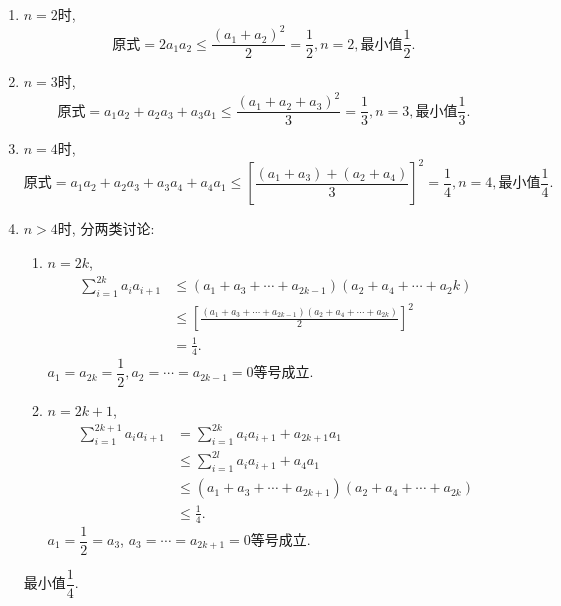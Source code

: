 \documentclass[8pt]{article}
\begin{document}
\begin{enumerate}
			\begin{enumerate}[label=$\arabic*^{\circ}$]
				\item $n=2$时, $$\text{原式}=2a_1 a_2 \leq \frac{(a_1 + a_2)^2}{2}=\frac{1}{2}, n=2, \text{最小值}\frac{1}{2}.$$
				\item $n=3$时, $$\text{原式}=a_1 a_2 + a_2 a_3 + a_3 a_1 \leq \frac{(a_1 + a_2 + a_3)^2}{3}=\frac{1}{3}, n=3, \text{最小值}\frac{1}{3}.$$
				\item $n=4$时, $$\text{原式}=a_1 a_2 + a_2 a_3 + a_3 a_4 + a_4 a_1 \leq \left[\frac{(a_1 + a_3) + (a_2 + a_4)}{3}\right]^2=\frac{1}{4}, n=4, \text{最小值}\frac{1}{4}.$$
				\item $n>4$时, 分两类讨论:
				\begin{enumerate}[label=4.$\arabic*^{\circ}$]
					\item $n=2k$, 
					\begin{align*}
						\sum_{i=1}^{2k} a_i a_{i+1} &\leq (a_1 + a_3 + \cdots + a_{2k-1})(a_2 + a_4 + \cdots + a_2k)\\
						&\leq \left[\frac{(a_1+a_3+\cdots+a_{2k-1})(a_2+a_4+\cdots+a_{2k})}{2}\right]^2\\
						&= \frac{1}{4}.
					\end{align*}
					$a_1 = a_{2k} = \dfrac{1}{2}, a_2 = \cdots = a_{2k-1}=0$等号成立.
					\item $n=2k+1$,
					\begin{align*}
						\sum_{i=1}^{2k+1} a_i a_{i+1} &= \sum_{i=1}^{2k} a_i a_{i+1} + a_{2k+1}a_1\\
						&\leq \sum_{i=1}^{2l} a_i a_{i+1} + a_4 a_1\\
						&\leq (a_1 + a_3 + \cdots + a_{2k+1})(a_2 + a_4 + \cdots + a_{2k})\\
						&\leq \frac{1}{4}.
					\end{align*}
					$a_1 = \dfrac{1}{2} = a_3$, $a_3 = \cdots = a_{2k+1} = 0$等号成立.
				\end{enumerate}
				最小值$\dfrac{1}{4}$.
			\end{enumerate}

	\end{enumerate}
\end{document}

